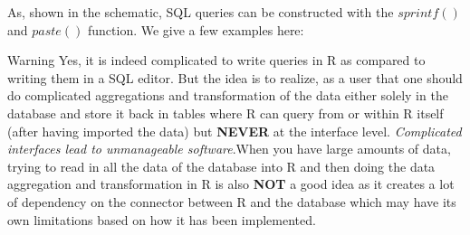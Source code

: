 As, shown in the schematic, SQL queries can be constructed with the $sprintf()$ and $paste()$ function. We give a few examples here:
\begin{knitrout}
\color{fgcolor}
\end{knitrout}

\begin{DIY}{Warning}
Yes, it is indeed complicated to write queries in R as compared to writing them in a SQL editor. But the idea is to realize, as a user that one should do complicated aggregations and transformation of the data either solely in the database and store it back in tables where R can query from or within R itself (after having imported the data) but \textbf{NEVER} at the interface level. \emph{Complicated interfaces lead to unmanageable software}.When you have large amounts of data, trying to read in all the data of the database into R and then doing the data aggregation and transformation in R is also \textbf{NOT} a good idea as it creates a lot of dependency on the connector between R and the database which may have its own limitations based on how it has been implemented.  
\end{DIY}
